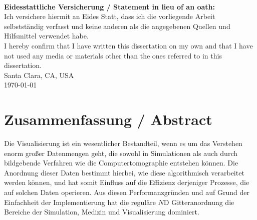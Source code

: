 %
%

\clearpage
\thispagestyle{empty}
~
\begin{flushleft}
  \textbf{Eidesstattliche Versicherung / Statement in lieu of an oath:}\\
  Ich versichere hiermit an Eides Statt, dass ich die vorliegende
  Arbeit selbstst\"andig verfasst und keine anderen als die angegebenen
  Quellen und Hilfsmittel verwendet habe.\\

  I hereby confirm that I have written this dissertation on my own
  and that I have not used any media or materials other than the ones
  referred to in this dissertation.\\[\baselineskip]

	Santa Clara, CA, USA\\
	\today{}\\%

\end{flushleft}

\clearpage

\section*{Zusammenfassung / Abstract}

Die Visualisierung ist ein wesentlicher Bestandteil, wenn es um das
Verstehen enorm gro\ss{}er Datenmengen geht, die sowohl in Simulationen
als auch durch bildgebende Verfahren wie die Computertomographie
entstehen k\"onnen. Die Anordnung dieser Daten bestimmt hierbei,
wie diese algorithmisch verarbeitet werden k\"onnen, und hat somit
Einfluss auf die Effizienz derjeniger Prozesse, die auf solchen Daten
operieren. Aus diesen Performanzgr\"unden und auf Grund der Einfachheit
der Implementierung hat die regul\"are $N$D Gitteranordnung die
Bereiche der Simulation, Medizin und Visualisierung dominiert.

